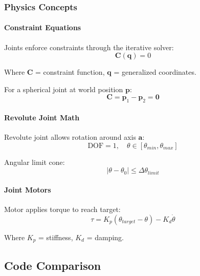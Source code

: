 \subsubsection{Physics Concepts}

\paragraph{Constraint Equations}

Joints enforce constraints through the iterative solver:
\begin{equation}
\mathbf{C}(\mathbf{q}) = 0
\end{equation}

Where $\mathbf{C}$ = constraint function, $\mathbf{q}$ = generalized coordinates.

For a spherical joint at world position $\mathbf{p}$:
\begin{equation}
\mathbf{C} = \mathbf{p}_1 - \mathbf{p}_2 = \mathbf{0}
\end{equation}

\paragraph{Revolute Joint Math}

Revolute joint allows rotation around axis $\mathbf{a}$:
\begin{equation}
\text{DOF} = 1, \quad \theta \in [\theta_{min}, \theta_{max}]
\end{equation}

Angular limit cone:
\begin{equation}
|\theta - \theta_0| \leq \Delta\theta_{limit}
\end{equation}

\paragraph{Joint Motors}

Motor applies torque to reach target:
\begin{equation}
\tau = K_p(\theta_{target} - \theta) - K_d \dot{\theta}
\end{equation}

Where $K_p$ = stiffness, $K_d$ = damping.


\subsection{Code Comparison}

